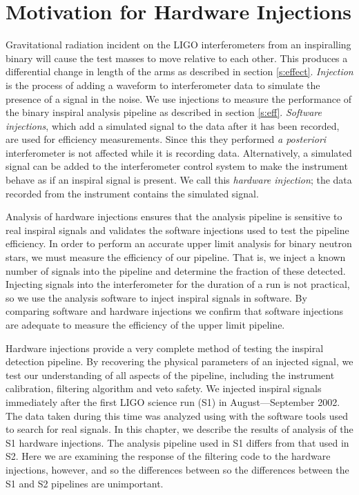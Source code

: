 
\section{Motivation for Hardware Injections}
\label{s:motivation}
Gravitational radiation incident on the LIGO interferometers from an
inspiralling binary will cause the test masses to move relative to each other.
This produces a differential change in length of the arms as described in
section \ref{s:effect}.  \emph{Injection} is the process of adding a waveform to
interferometer data to simulate the presence of a signal in the noise. We use
injections to measure the performance of the binary inspiral analysis
pipeline as described in section \ref{s:eff}.  \emph{Software injections},
which add a simulated signal to the data after it has been recorded, are used
for efficiency measurements. Since this they performed \emph{a posteriori}
interferometer is not affected while it is recording data.  Alternatively, a
simulated signal can be added to the interferometer control system to make the
instrument behave as if an inspiral signal is present. We call this
\emph{hardware injection}; the data recorded from the instrument contains the
simulated signal.

Analysis of hardware injections ensures that the analysis pipeline is
sensitive to real inspiral signals and validates the software injections used
to test the pipeline efficiency.  In order to perform an accurate upper limit
analysis for binary neutron stars, we must measure the efficiency of our
pipeline. That is, we inject a known number of signals into the pipeline and
determine the fraction of these detected.  Injecting signals into the
interferometer for the duration of a run is not practical, so we use the
analysis software to inject inspiral signals in software.  By comparing
software and hardware injections we confirm that software injections are
adequate to measure the efficiency of the upper limit pipeline.

Hardware injections provide a very complete method of testing the inspiral
detection pipeline. By recovering the physical parameters of an injected
signal, we test our understanding of all aspects of the pipeline, including
the instrument calibration, filtering algorithm and veto safety. We injected
inspiral signals immediately after the first LIGO science run (S1) in
August---September 2002. The data taken during this time was analyzed using
with the software tools used to search for real signals.  In this chapter, we
describe the results of analysis of the S1 hardware injections. The analysis
pipeline used in S1 differs from that used in S2\cite{LIGOS1iul}. Here we
are examining the response of the filtering code to the hardware injections,
however, and so the differences between so the differences between the S1 and
S2 pipelines are unimportant.

